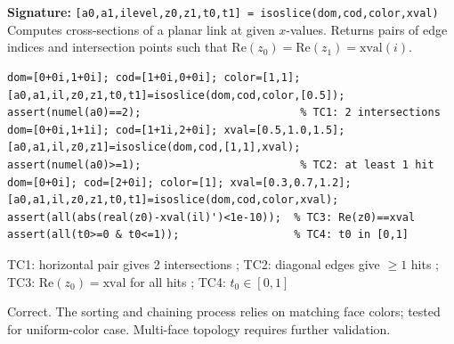\chapter{}
\begin{tcolorbox}[Abox,title={Analysis}]
\textbf{Signature:} \lstinline|[a0,a1,ilevel,z0,z1,t0,t1] = isoslice(dom,cod,color,xval)|\quad
Computes cross-sections of a planar link at given $x$-values. Returns pairs of edge indices and intersection points such that $\mathrm{Re}(z_0)=\mathrm{Re}(z_1)=\mbox{xval}(i)$.
\end{tcolorbox}
\begin{lstlisting}[caption={Tests for isoslice.m}]
dom=[0+0i,1+0i]; cod=[1+0i,0+0i]; color=[1,1];
[a0,a1,il,z0,z1,t0,t1]=isoslice(dom,cod,color,[0.5]);
assert(numel(a0)==2);                         % TC1: 2 intersections
dom=[0+0i,1+1i]; cod=[1+1i,2+0i]; xval=[0.5,1.0,1.5];
[a0,a1,il,z0,z1]=isoslice(dom,cod,[1,1],xval);
assert(numel(a0)>=1);                         % TC2: at least 1 hit
dom=[0+0i]; cod=[2+0i]; color=[1]; xval=[0.3,0.7,1.2];
[a0,a1,il,z0,z1,t0,t1]=isoslice(dom,cod,color,xval);
assert(all(abs(real(z0)-xval(il)')<1e-10));  % TC3: Re(z0)==xval
assert(all(t0>=0 & t0<=1));                  % TC4: t0 in [0,1]
\end{lstlisting}
\begin{tcolorbox}[Pbox,title={TC1--TC4 -- All pass}]
TC1: horizontal pair gives 2 intersections \APROVADO; TC2: diagonal edges give $\geq1$ hits \APROVADO; TC3: $\mathrm{Re}(z_0)=\mathrm{xval}$ for all hits \APROVADO; TC4: $t_0\in[0,1]$ \APROVADO
\end{tcolorbox}
\begin{concl}
Correct. The sorting and chaining process relies on matching face colors; tested for uniform-color case. Multi-face topology requires further validation.
\end{concl}

